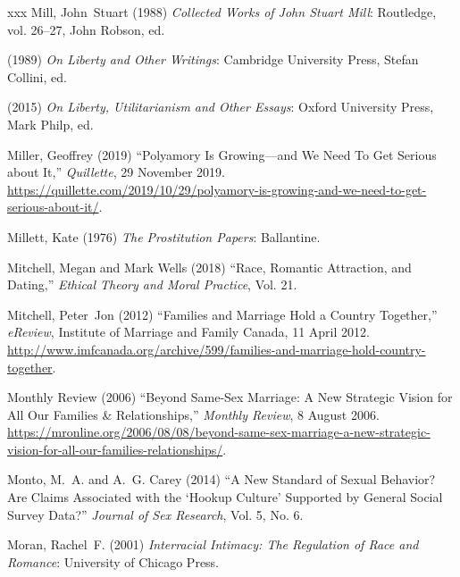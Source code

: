 \documentclass[]{jlreq} \usepackage{mystyle}
\begin{document}
\begin{thebibliography}{xxx}
Mill, John~Stuart (1988)  \textit{ Collected Works of John Stuart Mill}:
  Routledge, vol. 26--27, John Robson, ed.

 \bysame{}  (1989)  \textit{ On Liberty and Other Writings}: Cambridge
  University Press, Stefan Collini, ed.

 \bysame{}  (2015)  \textit{ On Liberty, Utilitarianism and Other Essays}:
  Oxford University Press, Mark Philp, ed.

Miller, Geoffrey (2019) ``Polyamory Is Growing---and We Need To Get Serious
  about It,'' \emph{Quillette}, 29 November 2019.
  \url{https://quillette.com/2019/10/29/polyamory-is-growing-and-we-need-to-get-serious-about-it/}.

Millett, Kate (1976)  \textit{ The Prostitution Papers}: Ballantine.

Mitchell, Megan and Mark Wells (2018) ``Race, Romantic Attraction, and
  Dating,'' \textit{ Ethical Theory and Moral Practice}, Vol. 21.

Mitchell, Peter~Jon (2012) ``Families and Marriage Hold a Country Together,''
  \emph{eReview}, Institute of Marriage and Family Canada, 11 April 2012.
  \url{http://www.imfcanada.org/archive/599/families-and-marriage-hold-country-together}.

{Monthly Review} (2006) ``Beyond Same-Sex Marriage: A New Strategic Vision for
  All Our Families \& Relationships,'' \emph{Monthly Review}, 8 August 2006.
  \url{https://mronline.org/2006/08/08/beyond-same-sex-marriage-a-new-strategic-vision-for-all-our-families-relationships/}.

Monto, M.~A. and A.~G. Carey (2014) ``A New Standard of Sexual Behavior? Are
  Claims Associated with the `Hookup Culture' Supported by General Social
  Survey Data?'' \textit{ Journal of Sex Research}, Vol. 5, No. 6.

Moran, Rachel~F. (2001)  \textit{ Interracial Intimacy: The Regulation of Race
  and Romance}: University of Chicago Press.


\end{thebibliography}
\end{document}
